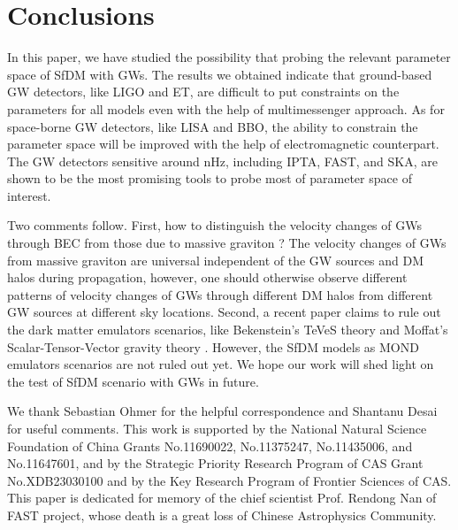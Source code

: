 \documentclass[aps,prd,twocolumn,10pt,groupedaddress]{revtex4-1}
\begin{document}
\section{Conclusions} \label{sec:conclusion}

In this paper, we have studied the possibility that probing the relevant parameter space of SfDM with GWs. The results we obtained indicate that ground-based GW detectors, like LIGO and ET, are difficult to put constraints on the parameters for all models even with the help of multimessenger approach. As for space-borne GW detectors, like LISA and BBO, the ability to constrain the parameter space will be improved with the help of electromagnetic counterpart. The GW detectors sensitive around nHz, including IPTA, FAST, and SKA, are shown to be the most promising tools to probe most of parameter space of interest.

Two comments follow. First, how to distinguish the velocity changes of GWs through BEC from those due to massive graviton ? The velocity changes of GWs from massive graviton are universal independent of the GW sources and DM halos during propagation, however, one should otherwise observe different patterns of velocity changes of GWs through different DM halos from different GW sources at different sky locations. Second, a recent paper \cite{Boran:2017rdn} claims to rule out the dark matter emulators scenarios, like Bekenstein's TeVeS theory \cite{Bekenstein:2004ne} and Moffat's Scalar-Tensor-Vector gravity theory \cite{Moffat:2005si}. However, the SfDM models as MOND emulators scenarios are not ruled out yet. We hope our work will shed light on the test of SfDM scenario with GWs in future.

\begin{acknowledgments}
We thank Sebastian Ohmer for the helpful correspondence and Shantanu Desai for useful comments. This work is supported by the National Natural Science Foundation of China Grants No.11690022, No.11375247, No.11435006, and No.11647601, and by the Strategic Priority Research Program of CAS Grant No.XDB23030100 and by the Key Research Program of Frontier Sciences of CAS. This paper is dedicated for memory of the chief scientist Prof. Rendong Nan of FAST project, whose death is a great loss of Chinese Astrophysics Community.
\end{acknowledgments}



\end{document}
